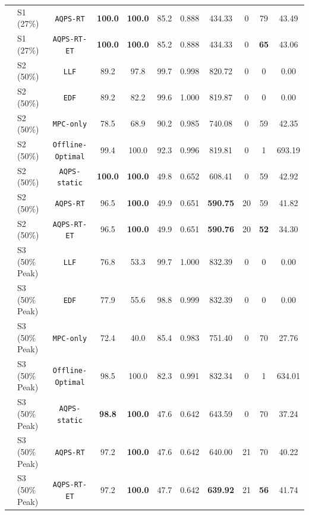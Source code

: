 \documentclass[final,3p,times,twocolumn]{elsarticle}
\begin{document}
\begin{table}[htbp]
\begin{tabular}{llccccccccc}
 & S1 (27\%) & \texttt{AQPS-RT}         & \textbf{100.0} & \textbf{100.0} & 85.2  & 0.888 & 434.33 & 0  & 79 & 43.49 \\
 & S1 (27\%) & \texttt{AQPS-RT-ET}      & \textbf{100.0} & \textbf{100.0} & 85.2  & 0.888 & 434.33 & 0  & \textbf{65} & 43.06 \\
\cmidrule{2-11}
 & S2 (50\%) & \texttt{LLF}             & 89.2  & 97.8  & 99.7  & 0.998 & 820.72 & 0  & 0  & 0.00  \\
 & S2 (50\%) & \texttt{EDF}             & 89.2  & 82.2  & 99.6  & 1.000 & 819.87 & 0  & 0  & 0.00  \\
 & S2 (50\%) & \texttt{MPC-only}        & 78.5  & 68.9  & 90.2  & 0.985 & 740.08 & 0  & 59 & 42.35 \\
 & S2 (50\%) & \texttt{Offline-Optimal} & 99.4  & 100.0 & 92.3  & 0.996 & 819.81 & 0  & 1  & 693.19 \\
 & S2 (50\%) & \texttt{AQPS-static}     & \textbf{100.0} & \textbf{100.0} & 49.8  & 0.652 & 608.41 & 0  & 59 & 42.92 \\
 & S2 (50\%) & \texttt{AQPS-RT}         & 96.5  & \textbf{100.0} & 49.9  & 0.651 & \textbf{590.75} & 20 & 59 & 41.82 \\
 & S2 (50\%) & \texttt{AQPS-RT-ET}      & 96.5  & \textbf{100.0} & 49.9  & 0.651 & \textbf{590.76} & 20 & \textbf{52} & 34.30 \\
\cmidrule{2-11}
 & S3 (50\% Peak) & \texttt{LLF}        & 76.8  & 53.3  & 99.7  & 1.000 & 832.39 & 0  & 0  & 0.00  \\
 & S3 (50\% Peak) & \texttt{EDF}        & 77.9  & 55.6  & 98.8  & 0.999 & 832.39 & 0  & 0  & 0.00  \\
 & S3 (50\% Peak) & \texttt{MPC-only}   & 72.4  & 40.0  & 85.4  & 0.983 & 751.40 & 0  & 70 & 27.76 \\
 & S3 (50\% Peak) & \texttt{Offline-Optimal} & 98.5 & 100.0 & 82.3 & 0.991 & 832.34 & 0  & 1  & 634.01 \\
 & S3 (50\% Peak) & \texttt{AQPS-static}& \textbf{98.8}  & \textbf{100.0} & 47.6  & 0.642 & 643.59 & 0  & 70 & 37.24 \\
 & S3 (50\% Peak) & \texttt{AQPS-RT}    & 97.2  & \textbf{100.0} & 47.6  & 0.642 & 640.00 & 21 & 70 & 40.22 \\
 & S3 (50\% Peak) & \texttt{AQPS-RT-ET} & 97.2  & \textbf{100.0} & 47.7  & 0.642 & \textbf{639.92} & 21 & \textbf{56} & 41.74 \\
\bottomrule
\end{tabular}
\end{table}
\end{document}
